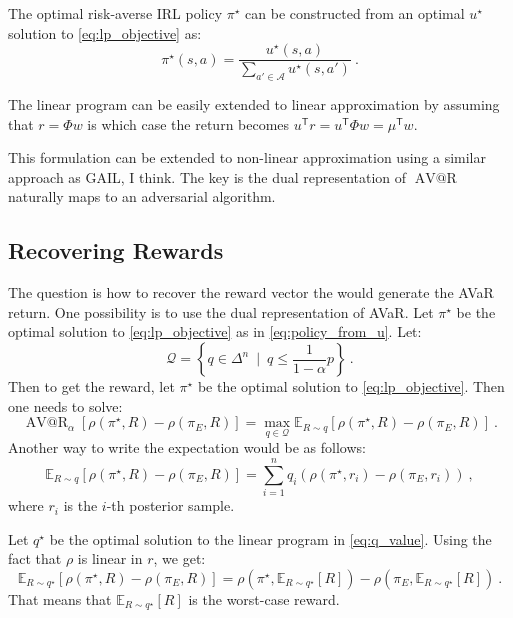 \documentclass{article}
\makeatletter
\newcommand{\tr}{^\mathsf{T}}
\DeclareMathOperator{\avar}{AV@R}
\newcommand{\Ex}{\mathbb{E}}
\newcommand{\opt}{^{\star}}
\makeatother
\begin{document}
	
	The optimal risk-averse IRL policy $\pi\opt$ can be constructed from an optimal $u\opt$ solution to \eqref{eq:lp_objective} as:
	\begin{equation} \label{eq:policy_from_u}
	\pi\opt(s,a) = \frac{u\opt(s,a)}{\sum_{a'\in\mathcal{A}} u\opt(s,a') }~. 
	\end{equation}
	
	
	The linear program can be easily extended to linear approximation by assuming that $r = \Phi w$ is which case the return becomes $u\tr r = u\tr \Phi w = \mu\tr w$.
	
	This formulation can be extended to non-linear approximation using a similar approach as GAIL, I think. The key is the dual representation of $\avar$ naturally maps to an adversarial algorithm. 

\subsection{Recovering Rewards}

The question is how to recover the reward vector the would generate the AVaR return. One possibility is to use the dual representation of AVaR. Let $\pi\opt$ be the optimal solution to \eqref{eq:lp_objective} as in \eqref{eq:policy_from_u}. Let:
\[ \mathcal{Q} = \left\{ q \in \Delta^n ~\mid~ q \le \frac{1}{1-\alpha} p \right\} ~. \]
Then to get the reward, let $\pi\opt$ be the optimal solution to \eqref{eq:lp_objective}. Then one needs to solve:
\begin{equation} \label{eq:q_value}
\avar_\alpha\left[ \rho(\pi\opt, R) - \rho(\pi_E, R) \right] = \max_{q\in\mathcal{Q}} \Ex_{R \sim q} \left[ \rho(\pi\opt, R) - \rho(\pi_E, R) \right]~.
\end{equation}
Another way to write the expectation would be as follows:
\[ \Ex_{R \sim q} \left[ \rho(\pi\opt, R) - \rho(\pi_E, R) \right] = \sum_{i=1}^n q_i \left( \rho(\pi\opt, r_i) - \rho(\pi_E, r_i) \right)~, \]
where $r_i$ is the $i$-th posterior sample.


Let $q\opt$ be the optimal solution to the linear program in \eqref{eq:q_value}. Using the fact that $\rho$ is linear in $r$, we get:
\[ \Ex_{R \sim q\opt} \left[ \rho(\pi\opt, R) - \rho(\pi_E, R) \right] =  \rho\left(\pi\opt, \Ex_{R \sim q\opt}[R]\right) - \rho\left(\pi_E, \Ex_{R \sim q\opt}[R]\right)~.\]
That means that $\Ex_{R \sim q\opt}[R]$ is the worst-case reward.

	


	
\end{document}
